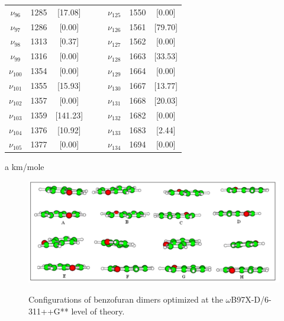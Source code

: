 \begin{table}[H]
\begin{center}
\begin{threeparttable}
\begin{tabular}{c c c c c c c c}
$\nu_{96}$&  1285 &[17.08]  &&& $\nu_{125}$&  1550 &[0.00]  \\ 
$\nu_{97}$&  1286 & [0.00] &&& $\nu_{126}$&  1561 & [79.70] \\ 
$\nu_{98}$&  1313 & [0.37] &&& $\nu_{127}$&  1562 & [0.00] \\ 
$\nu_{99}$&  1316 & [0.00] & &&$\nu_{128}$&  1663 & [33.53] \\ 
$\nu_{100}$&  1354 & [0.00] &&& $\nu_{129}$&  1664 & [0.00] \\ 
$\nu_{101}$&  1355 & [15.93] & &&$\nu_{130}$&  1667 &  [13.77]\\ 
$\nu_{102}$&  1357 & [0.00] & &&$\nu_{131}$&  1668 & [20.03] \\ 
$\nu_{103}$&  1359 & [141.23] & &&$\nu_{132}$&  1682 & [0.00] \\ 
$\nu_{104}$&  1376 & [10.92] & &&$\nu_{133}$&  1683 & [2.44] \\ 
$\nu_{105}$&  1377 & [0.00] & &&$\nu_{134}$&  1694 & [0.00]\\ 
	\bottomrule
	\end{tabular}

\begin{tablenotes}
	\item[a] km/mole
\end{tablenotes}
\end{threeparttable}
\end{center}
\label{freq-18-dimethylcarbazoleDi}
\end{table}	





\begin{figure}[H]
	\begin{center}
	\includegraphics[scale=0.8]{image/Benzof-di}
\end{center}
	\caption{}Configurations of benzofuran dimers optimized at the $\omega$B97X-D/6-311++G** level of theory.
\end{figure}



